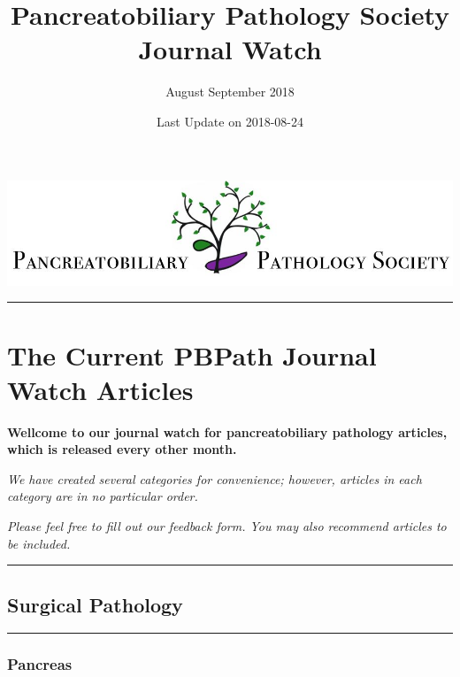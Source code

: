 \documentclass[]{article}
\title{Pancreatobiliary Pathology Society Journal Watch}
\subtitle{August September 2018}
\author{}
\date{Last Update on 2018-08-24}
\begin{document}
\maketitle

{
\setcounter{tocdepth}{2}
\tableofcontents
}
\href{http://pbpath.org/}{\includegraphics{figures/PBP_header_logo.jpg}}

\begin{center}\rule{0.5\linewidth}{\linethickness}\end{center}

\hypertarget{the-current-pbpath-journal-watch-articles}{%
\section{The Current PBPath Journal Watch
Articles}\label{the-current-pbpath-journal-watch-articles}}

\textbf{Wellcome to our journal watch for pancreatobiliary pathology
articles, which is released every other month.}

\emph{We have created several categories for convenience; however,
articles in each category are in no particular order.}

\emph{Please feel free to fill out our feedback form. You may also
recommend articles to be included.}

\pagebreak

\begin{center}\rule{0.5\linewidth}{\linethickness}\end{center}

\hypertarget{surgical-pathology}{%
\subsection{Surgical Pathology}\label{surgical-pathology}}

\begin{center}\rule{0.5\linewidth}{\linethickness}\end{center}

\hypertarget{pancreas}{%
\subsubsection{Pancreas}\label{pancreas}}
\end{document}
